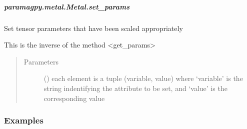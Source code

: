 \documentclass[a4paper,10pt,english,openany,oneside]{sphinxmanual}
\begin{document}
\begin{fulllineitems}
\begin{fulllineitems}
\begin{fulllineitems}
\begin{quote}
\begin{description}
\begin{itemize}
\end{itemize}

\end{description}\end{quote}

\end{fulllineitems}



\subparagraph{paramagpy.metal.Metal.set\_params}
\label{\detokenize{reference/generated/paramagpy.metal.Metal.set_params:paramagpy-metal-metal-set-params}}\label{\detokenize{reference/generated/paramagpy.metal.Metal.set_params::doc}}

\begin{fulllineitems}
\label{\detokenize{reference/generated/paramagpy.metal.Metal.set_params:paramagpy.metal.Metal.set_params}}
\sphinxAtStartPar
Set tensor parameters that have been scaled appropriately

\sphinxAtStartPar
This is the inverse of the method \textless{}get\_params\textgreater{}
\begin{quote}\begin{description}
\item[{Parameters}] \leavevmode
\sphinxAtStartPar
{} () \textendash{} each element is a tuple (variable, value) where ‘variable’
is the string indentifying the attribute to be set, and ‘value’
is the corresponding value

\end{description}\end{quote}
\subsubsection*{Examples}

\begin{sphinxVerbatim}[commandchars=\\\{\}]
  
\PYG{p}{[}\PYG{p}{]}
\end{sphinxVerbatim}


\end{fulllineitems}
\end{fulllineitems}
\end{fulllineitems}
\end{document}
